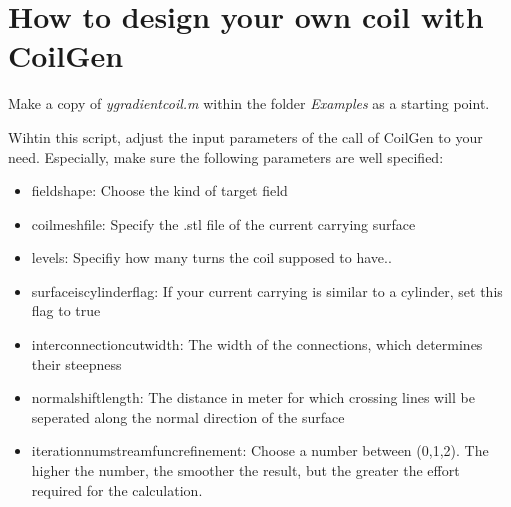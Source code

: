 \documentclass[a4paper,12pt]{book}
\begin{document}
\newpage

\section{How to design your own coil with CoilGen}

Make a copy of \textit{y\textunderscore gradient\textunderscore coil.m} within the folder \textit{Examples} as a starting point. 

Wihtin this script, adjust the input parameters of the call of CoilGen to your need.  Especially, make sure the following parameters are well specified:

\begin{itemize}
	\item field\textunderscore shape: Choose the kind of target field
	\item coil\textunderscore mesh\textunderscore file: Specify the .stl file of the current carrying surface
	\item levels: Specifiy how many turns the coil supposed to have..
	\item surface\textunderscore is\textunderscore cylinder\textunderscore flag: If your current carrying is similar to a cylinder, set this flag to true
	\item interconnection\textunderscore cut\textunderscore width: The width of the connections, which determines their steepness
	\item normal\textunderscore shift\textunderscore length: The distance in meter for which crossing lines will be seperated along the normal direction of the surface
	\item iteration\textunderscore num\textunderscore stream\textunderscore func\textunderscore refinement: Choose a number between (0,1,2). The higher the number, the smoother the result, but the greater the effort required for the calculation. 
\end{itemize}
\end{document}
